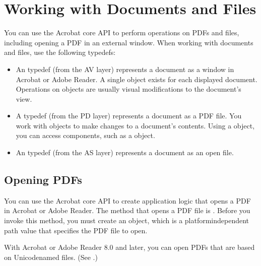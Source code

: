\documentclass[letterpaper,12pt,english,openany,oneside]{sphinxmanual}
\begin{document}
\chapter{Working with Documents and Files}
\label{\detokenize{Plugins_Documents:working-with-documents-and-files}}\label{\detokenize{Plugins_Documents::doc}}
You can use the Acrobat core API to perform operations on PDFs and files, including opening a PDF in an external window. When working with documents and files, use the following typedefs:
\begin{itemize}
\item {} 
An  typedef (from the AV layer) represents a document as a window in Acrobat or Adobe Reader. A single  object exists for each displayed document. Operations on  objects are usually visual modifications to the document’s view.

\item {} 
A  typedef (from the PD layer) represents a document as a PDF file. You work with  objects to make changes to a document’s contents. Using a  object, you can access components, such as a  object.

\item {} 
An  typedef (from the AS layer) represents a document as an open file.

\end{itemize}


\section{Opening PDFs}
\label{\detokenize{Plugins_Documents:opening-pdfs}}
You can use the Acrobat core API to create application logic that opens a PDF in Acrobat or Adobe Reader. The method that opens a PDF file is . Before you invoke this method, you must create an  object, which is a platform\sphinxhyphen{}independent path value that specifies the PDF file to open.

With Acrobat or Adobe Reader 8.0 and later, you can open PDFs that are based on Unicode\sphinxhyphen{}named files. (See .)
\end{document}
